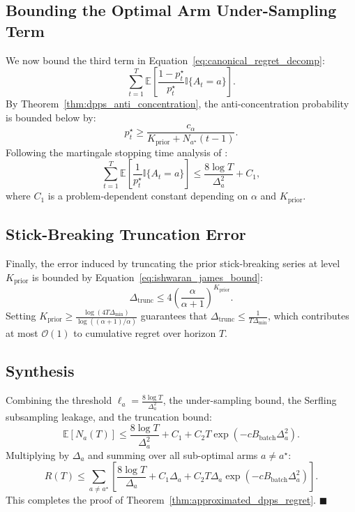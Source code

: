 \documentclass[twoside]{article}
\begin{document}
\subsection{Bounding the Optimal Arm Under-Sampling Term}
We now bound the third term in Equation~\eqref{eq:canonical_regret_decomp}:
\begin{equation}
\sum_{t=1}^T \mathbb{E}\left[ \frac{1 - p_t^\star}{p_t^\star} \mathbb{I}\{A_t = a\} \right].
\end{equation}
By Theorem~\ref{thm:dpps_anti_concentration}, the anti-concentration probability is bounded below by:
\begin{equation}
p_t^\star \ge \frac{c_\alpha}{K_{\text{prior}} + N_{a^\star}(t-1)}.
\end{equation}
Following the martingale stopping time analysis of \citet{agrawal2012analysis, kaufmann2012thompson}:
\begin{equation}
\sum_{t=1}^T \mathbb{E}\left[ \frac{1}{p_t^\star} \mathbb{I}\{A_t = a\} \right] \le \frac{8 \log T}{\Delta_a^2} + C_1,
\end{equation}
where $C_1$ is a problem-dependent constant depending on $\alpha$ and $K_{\text{prior}}$.

\subsection{Stick-Breaking Truncation Error}
Finally, the error induced by truncating the prior stick-breaking series at level $K_{\text{prior}}$ is bounded by Equation~\eqref{eq:ishwaran_james_bound}:
\begin{equation}
\Delta_{\text{trunc}} \le 4 \left( \frac{\alpha}{\alpha + 1} \right)^{K_{\text{prior}}}.
\end{equation}
Setting $K_{\text{prior}} \ge \frac{\log(4 T \Delta_{\min})}{\log((\alpha+1)/\alpha)}$ guarantees that $\Delta_{\text{trunc}} \le \frac{1}{T \Delta_{\min}}$, which contributes at most $\mathcal{O}(1)$ to cumulative regret over horizon $T$.

\subsection{Synthesis}
Combining the threshold $\ell_a = \frac{8 \log T}{\Delta_a^2}$, the under-sampling bound, the Serfling subsampling leakage, and the truncation bound:
\begin{equation}
\mathbb{E}[N_a(T)] \le \frac{8 \log T}{\Delta_a^2} + C_1 + C_2 T \exp\left( - c B_{\text{batch}} \Delta_a^2 \right).
\end{equation}
Multiplying by $\Delta_a$ and summing over all sub-optimal arms $a \ne a^\star$:
\begin{equation}
R(T) \le \sum_{a \ne a^\star} \left[ \frac{8 \log T}{\Delta_a} + C_1 \Delta_a + C_2 T \Delta_a \exp\left( - c B_{\text{batch}} \Delta_a^2 \right) \right].
\end{equation}
This completes the proof of Theorem~\ref{thm:approximated_dpps_regret}. \hfill $\blacksquare$
\end{document}
